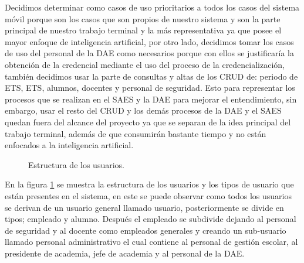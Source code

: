 Decidimos determinar como casos de uso prioritarios a todos los casos del sistema móvil porque son los casos que son propios de nuestro sistema y son la parte principal de nuestro trabajo terminal y la más representativa ya que posee el mayor enfoque de inteligencia artificial, por otro lado, decidimos tomar los casos de uso del personal de la DAE como necesarios porque con ellos se justificaría la obtención de la credencial mediante el uso del proceso de la credencialización, también decidimos usar la parte de consultas y altas de los CRUD de: periodo de ETS, ETS, alumnos, docentes y personal de seguridad. Esto para representar los procesos que se realizan en el SAES y la DAE para mejorar el entendimiento, sin embargo, usar el resto del CRUD y los demás procesos de la DAE y el SAES quedan fuera del alcance del proyecto ya que se separan de la idea principal del trabajo terminal, además de que consumirán bastante tiempo y no están enfocados a la inteligencia artificial.


\begin{figure}[htbp!]
	\begin{center}
		\caption{Estructura de los usuarios.}
		\label{fig:EstructuraU}
	\end{center}
\end{figure} 

En la figura \ref{fig:EstructuraU} se muestra la estructura de los usuarios y los tipos de usuario que están presentes en el sistema, en este se puede observar como todos los usuarios se derivan de un usuario general llamado usuario, posteriormente se divide en tipos; empleado y alumno. Después el empleado se subdivide dejando al personal de seguridad y al docente como empleados generales y creando un sub-usuario llamado personal administrativo el cual contiene al personal de gestión escolar, al presidente de academia, jefe de academia y al personal de la DAE. 

